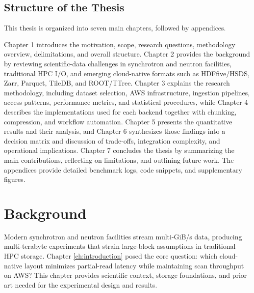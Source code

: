 \documentclass[nomenclature, english, bibtex]{kththesis}
\numberwithin{listing}{chapter}
\begin{document}
\section{Structure of the Thesis}
This thesis is organized into seven main chapters, followed by appendices.

Chapter 1 introduces the motivation, scope, research questions, methodology overview, delimitations, and overall structure. Chapter 2 provides the background by reviewing scientific-data challenges in synchrotron and neutron facilities, traditional \gls{HPC} I/O, and emerging cloud-native formats such as \gls{HDFfive}/\gls{HSDS}, Zarr, Parquet, TileDB, and \gls{ROOT}/\gls{TTree}. Chapter 3 explains the research methodology, including dataset selection, \gls{AWS} infrastructure, ingestion pipelines, access patterns, performance metrics, and statistical procedures, while Chapter 4 describes the implementations used for each backend together with chunking, compression, and workflow automation. Chapter 5 presents the quantitative results and their analysis, and Chapter 6 synthesizes those findings into a decision matrix and discussion of trade-offs, integration complexity, and operational implications. Chapter 7 concludes the thesis by summarizing the main contributions, reflecting on limitations, and outlining future work. The appendices provide detailed benchmark logs, code snippets, and supplementary figures.











\cleardoublepage
\chapter{Background}
\label{ch:background}
Modern synchrotron and neutron facilities stream multi-GiB/s data, producing multi-terabyte experiments that strain large-block assumptions in traditional \gls{HPC} storage. Chapter \ref{ch:introduction} posed the core question: which cloud-native layout minimizes partial-read latency while maintaining scan throughput on \gls{AWS}? This chapter provides scientific context, storage foundations, and prior art needed for the experimental design and results.
\end{document}
